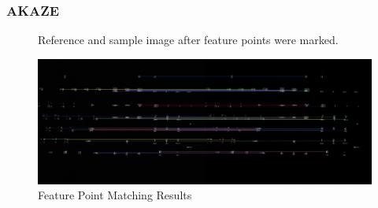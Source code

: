 		\subsubsection{AKAZE}
		\begin{figure}[H]
			\caption{Reference and sample image after feature points were marked.}
			\label{fig:siftFeaturePoints}
		\end{figure}
		\begin{figure}[H]
			\includegraphics[width=\linewidth]{figsrc/simulation/normal/akaze_matches.png}
			\caption{Feature Point Matching Results}
			\label{fig:sifeMatchingResult}
		\end{figure}
